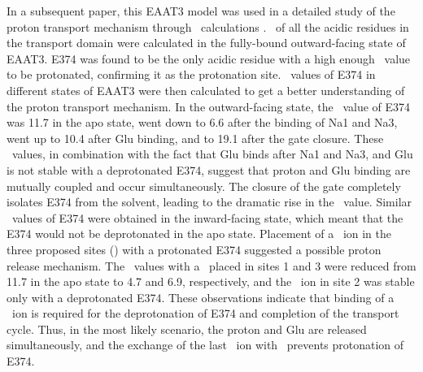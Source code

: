 In a subsequent paper, this EAAT3 model was used in a detailed study of the 
proton transport mechanism through \pka\ calculations 
\cite{Heinzelmann2014,Bahar2014}. \pka\ of all the acidic residues in the 
transport domain were calculated in the fully-bound outward-facing state of 
EAAT3. E374 was found to be the only acidic residue with a high enough \pka\ 
value to be protonated, confirming it as the protonation site. \pka\ values of 
E374 in different states of EAAT3 were then calculated to get a better 
understanding of the  proton transport mechanism. In the outward-facing state, 
the \pka\ value of E374 was 11.7 in the apo state, went down to 6.6 after the 
binding of Na1 and Na3, went up to 10.4 after Glu binding, and to 19.1 after the 
gate closure. These \pka\ values, in combination with the fact that Glu binds 
after Na1 and Na3, and Glu is not stable with a deprotonated E374, suggest that 
proton and Glu binding are mutually coupled and occur simultaneously. The 
closure of the gate completely isolates E374 from the solvent, leading to the 
dramatic rise in the \pka\ value. Similar \pka\ values of E374 were obtained 
in the inward-facing state, which meant that the E374 would not be deprotonated 
in the apo state. Placement of a \K\ ion in the three proposed sites 
(\tabref{review:tab3}) with a protonated E374 suggested a possible proton release 
mechanism. The \pka\ values with a \K\ placed in sites 1 and 3 were reduced from 
11.7 in the apo state to 4.7 and 6.9, respectively, and the \K\ ion in site 2 
was stable only with a deprotonated E374. These observations indicate that 
binding of a \K\ ion is required for the deprotonation of E374 and completion 
of the transport cycle. Thus, in the most likely scenario, the proton and Glu 
are released simultaneously, and the exchange of the last \Na\ ion with \K\ 
prevents protonation of E374.

